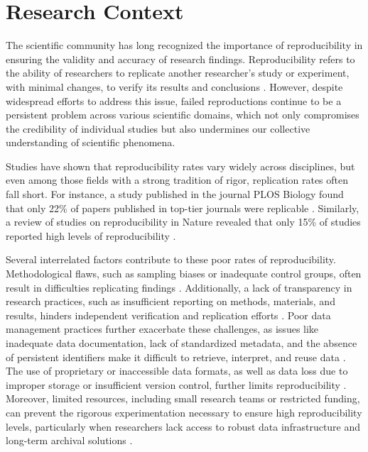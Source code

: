 \documentclass[final]{rc-book-2.14}
\begin{document}
\section{Research Context}
\label{sec:introduction:context}

The scientific community has long recognized the importance of reproducibility in ensuring the validity and accuracy of research findings. Reproducibility refers to the ability of researchers to replicate another researcher's study or experiment, with minimal changes, to verify its results and conclusions \cite{vasilevsky_reproducibility_2013}. However, despite widespread efforts to address this issue, failed reproductions continue to be a persistent problem across various scientific domains, which not only compromises the credibility of individual studies but also undermines our collective understanding of scientific phenomena.

Studies have shown that reproducibility rates vary widely across disciplines, but even among those fields with a strong tradition of rigor, replication rates often fall short. For instance, a study published in the journal PLOS Biology found that only 22\% of papers published in top-tier journals were replicable \cite{freedman_economics_2015}. Similarly, a review of studies on reproducibility in Nature revealed that only 15\% of studies reported high levels of reproducibility \cite{landis_call_2012}.

Several interrelated factors contribute to these poor rates of reproducibility. Methodological flaws, such as sampling biases or inadequate control groups, often result in difficulties replicating findings \cite{baker2016reproducibility}. Additionally, a lack of transparency in research practices, such as insufficient reporting on methods, materials, and results, hinders independent verification and replication efforts \cite{munafo2017manifesto}. Poor data management practices further exacerbate these challenges, as issues like inadequate data documentation, lack of standardized metadata, and the absence of persistent identifiers make it difficult to retrieve, interpret, and reuse data \cite{wilkinson2016fair}. The use of proprietary or inaccessible data formats, as well as data loss due to improper storage or insufficient version control, further limits reproducibility \cite{peng2011reproducible}. Moreover, limited resources, including small research teams or restricted funding, can prevent the rigorous experimentation necessary to ensure high reproducibility levels, particularly when researchers lack access to robust data infrastructure and long-term archival solutions \cite{stark2018before}.
\end{document}
